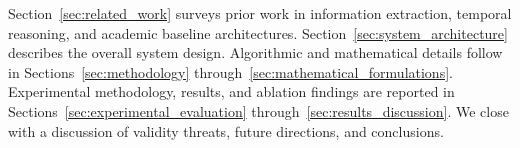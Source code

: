 Section~\ref{sec:related_work} surveys prior work in information extraction, temporal reasoning, and academic baseline architectures. Section~\ref{sec:system_architecture} describes the overall system design. Algorithmic and mathematical details follow in Sections~\ref{sec:methodology} through~\ref{sec:mathematical_formulations}. Experimental methodology, results, and ablation findings are reported in Sections~\ref{sec:experimental_evaluation} through~\ref{sec:results_discussion}. We close with a discussion of validity threats, future directions, and conclusions.
